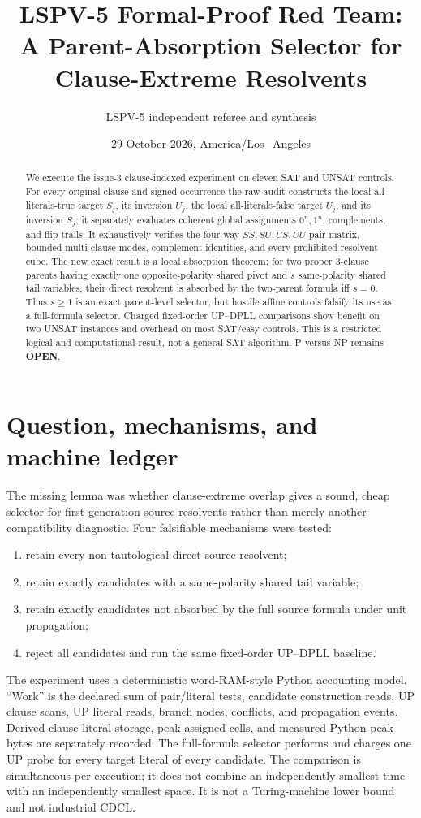 \documentclass[11pt]{article}
\title{LSPV-5 Formal-Proof Red Team:\\A Parent-Absorption Selector for Clause-Extreme Resolvents}
\author{LSPV-5 independent referee and synthesis}
\date{29 October 2026, America/Los\_Angeles}
\newcommand{\OPEN}{\textbf{OPEN}}
\begin{document}
\maketitle

\begin{abstract}
We execute the issue-3 clause-indexed experiment on eleven SAT and UNSAT controls.  For every original clause and signed occurrence the raw audit constructs the local all-literals-true target $S_j$, its inversion $U_j$, the local all-literals-false target $U_j$, and its inversion $S_j$; it separately evaluates coherent global assignments $0^n,1^n$, complements, and flip trails.  It exhaustively verifies the four-way $SS,SU,US,UU$ pair matrix, bounded multi-clause modes, complement identities, and every prohibited resolvent cube.  The new exact result is a local absorption theorem: for two proper 3-clause parents having exactly one opposite-polarity shared pivot and $s$ same-polarity shared tail variables, their direct resolvent is absorbed by the two-parent formula iff $s=0$.  Thus $s\geq1$ is an exact parent-level selector, but hostile affine controls falsify its use as a full-formula selector.  Charged fixed-order UP--DPLL comparisons show benefit on two UNSAT instances and overhead on most SAT/easy controls.  This is a restricted logical and computational result, not a general SAT algorithm.  P versus NP remains \OPEN.
\end{abstract}

\section{Question, mechanisms, and machine ledger}
The missing lemma was whether clause-extreme overlap gives a sound, cheap selector for first-generation source resolvents rather than merely another compatibility diagnostic.  Four falsifiable mechanisms were tested:
\begin{enumerate}
\item retain every non-tautological direct source resolvent;
\item retain exactly candidates with a same-polarity shared tail variable;
\item retain exactly candidates not absorbed by the full source formula under unit propagation;
\item reject all candidates and run the same fixed-order UP--DPLL baseline.
\end{enumerate}
The experiment uses a deterministic word-RAM-style Python accounting model.  ``Work'' is the declared sum of pair/literal tests, candidate construction reads, UP clause scans, UP literal reads, branch nodes, conflicts, and propagation events.  Derived-clause literal storage, peak assigned cells, and measured Python peak bytes are separately recorded.  The full-formula selector performs and charges one UP probe for every target literal of every candidate.  The comparison is simultaneous per execution; it does not combine an independently smallest time with an independently smallest space.  It is not a Turing-machine lower bound and not industrial CDCL.
\end{document}
